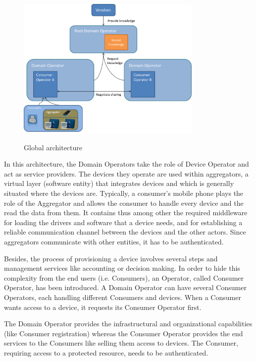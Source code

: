 \begin{figure}[!ht]
	\centering
	\includegraphics[width=0.8\textwidth]{images/design.png}\\
	\caption{Global architecture}
	\label{fig:concept__architecture}
\end{figure}

In this architecture, the Domain Operators take the role of Device Operator and act as service providers. The devices they operate are used within aggregators, a virtual layer (software entity) that integrates devices and which is generally situated where the devices are. Typically, a consumer's mobile phone plays the role of the Aggregator and allows the consumer to handle every device and the read the data from them. It contains thus among other the required middleware for loading the drivers and software that a device needs, and for establishing a reliable communication channel between the devices and the other actors. Since aggregators communicate with other entities, it has to be authenticated.

	Besides, the process of provisioning a device involves several steps and management services like accounting or decision making. In order to hide this complexity from the end users (i.e. Consumers), an Operator, called Consumer Operator, has been introduced. A Domain Operator can have several Consumer Operators, each handling different Consumers and devices. When a Consumer wants access to a device, it requests its Consumer Operator first.
	
	The Domain Operator provides the infrastructural and organizational capabilities (like Consumer registration) whereas the Consumer Operator provides the end services to the Consumers like selling them access to devices. The Consumer, requiring access to a protected resource, needs to be authenticated. 

